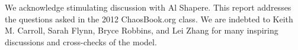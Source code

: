 \begin{acknowledgments}
We acknowledge stimulating discussion with Al Shapere.
This report addresses the questions asked in
the 2012 ChaosBook.org class.
We are indebted to Keith M. Carroll, Sarah Flynn,
Bryce Robbins,
and
Lei Zhang
for many inspiring discussions and cross-checks of the model.
\end{acknowledgments}
